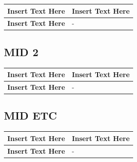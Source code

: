\documentclass [11pt]{article}
\begin{document}
\begin{longtable}{| p{ } | p{ } | }\hline 
\textbf{Insert Text Here} & \textbf{Insert Text Here} \\ \hline
\textbf{Insert Text Here} & -\\ \hline 
\end{longtable}


\subsection {MID 2 }

\begin{longtable}{| p{ } | p{ } | }\hline 
\textbf{Insert Text Here} & \textbf{Insert Text Here} \\ \hline
\textbf{Insert Text Here} & -\\ \hline 
\end{longtable}


\subsection {MID ETC}

\begin{longtable}{| p{ } | p{ } | }\hline 
\textbf{Insert Text Here} & \textbf{Insert Text Here} \\ \hline
\textbf{Insert Text Here} & -\\ \hline 
\end{longtable}

\end{document}
